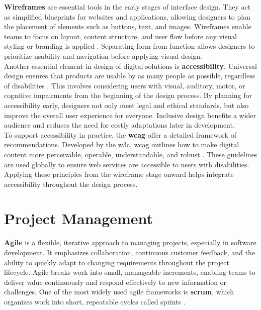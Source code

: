 \textbf{Wireframes} are essential tools in the early stages of interface design. They act as simplified blueprints for websites and applications, allowing designers to plan the placement of elements such as buttons, text, and images. Wireframes enable teams to focus on layout, content structure, and user flow before any visual styling or branding is applied \cite{balsamiq:wireframe}. Separating form from function allows designers to prioritize usability and navigation before applying visual design. \\


Another essential element in design of digital solutions is \textbf{accessibility}. Universal design ensures that products are usable by as many people as possible, regardless of disabilities \cite{uutilsynet:universellutforming}. This involves considering users with visual, auditory, motor, or cognitive impairments from the beginning of the design process. By planning for accessibility early, designers not only meet legal and ethical standards, but also improve the overall user experience for everyone. Inclusive design benefits a wider audience and reduces the need for costly adaptations later in development. \\

To support accessibility in practice, the \textbf{\gls{wcag}} offer a detailed framework of recommendations. Developed by the \gls{w3c}, \gls{wcag} outlines how to make digital content more perceivable, operable, understandable, and robust \cite{levelaccess:wcag}. These guidelines are used globally to ensure web services are accessible to users with disabilities. Applying these principles from the wireframe stage onward helps integrate accessibility throughout the design process.

\section{Project Management}
\label{sec:project-management}

\textbf{Agile} is a flexible, iterative approach to managing projects, especially in software development. It emphasizes collaboration, continuous customer feedback, and the ability to quickly adapt to changing requirements throughout the project lifecycle. Agile breaks work into small, manageable increments, enabling teams to deliver value continuously and respond effectively to new information or challenges. One of the most widely used agile frameworks is \textbf{\gls{scrum}}, which organizes work into short, repeatable cycles called sprints \cite{scrumguides:scrum}. \\


